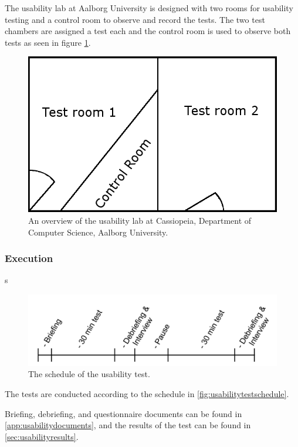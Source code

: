 The usability lab at Aalborg University is designed with two rooms for usability testing and a control room to observe and record the tests.
The two test chambers are assigned a test each and the control room is used to observe both tests as seen in figure \ref{fig:testsetup}.

\begin{figure}[H]
	\centering
		\includegraphics[width=\textwidth]{images/testSetup.png}
	\caption{An overview of the usability lab at Cassiopeia, Department of Computer Science, Aalborg University.}
	\label{fig:testsetup}
\end{figure}

\subsubsection*{Execution} s

\begin{figure}[H]
	\centering
		\includegraphics[width=\textwidth]{images/usabilityTestSchedule.png}
	\caption{The schedule of the usability test.}
	\label{fig:usabilitytestschedule}
\end{figure}

The tests are conducted according to the schedule in \autoref{fig:usabilitytestschedule}.

Briefing, debriefing, and questionnaire documents can be found in \autoref{app:usabilitydocuments}, and the results of the test can be found in \autoref{sec:usabilityresults}.
